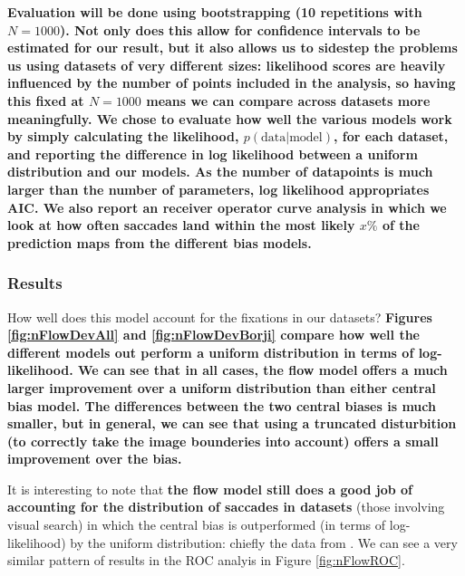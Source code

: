 \documentclass[a4paper, twocolumn, oneside, 11pt]{article}
\begin{document}
\textbf{Evaluation will be done using bootstrapping (10 repetitions with $N=1000$). Not only does  this allow for confidence intervals to be estimated for our result, but it also allows us to sidestep the problems us using datasets of very different sizes: likelihood scores are heavily influenced by the number of points included in the analysis, so having this fixed at $N=1000$ means we can compare across datasets more meaningfully. We chose to evaluate how well the various models work by simply calculating the likelihood, $p(\text{data}|\text{model})$, for each dataset, and reporting the difference in log likelihood between a uniform distribution and our models. As the number of datapoints is much larger than the number of parameters, log likelihood appropriates AIC. We also report an receiver operator curve \citep{green-swets1966} analysis in which we look at how often saccades land within the most likely $x\%$ of the prediction maps from the different bias models.}

\subsubsection{Results}

How well does this model account for the fixations in our datasets? \textbf{Figures \ref{fig:nFlowDevAll} and \ref{fig:nFlowDevBorji} compare how well the different models out perform a uniform distribution in terms of log-likelihood. We can see that in all cases, the flow model offers a much larger improvement over a uniform distribution than either central bias model. The differences between the two central biases is much smaller, but in general, we can see that using a truncated disturbition (to correctly take the image bounderies into account) offers a small improvement over the \cite{clarke-tatler2014} bias.} 

It is interesting to note that \textbf{the flow model still does a good job of accounting for the distribution of saccades in datasets} (those involving visual search) in which the central bias is outperformed (in terms of log-likelihood) by the uniform distribution: chiefly the data from \cite{clarke2009,asher2013,tatler2007}. We can see a very similar pattern of results in the ROC analyis in Figure \ref{fig:nFlowROC}.
\end{document}
